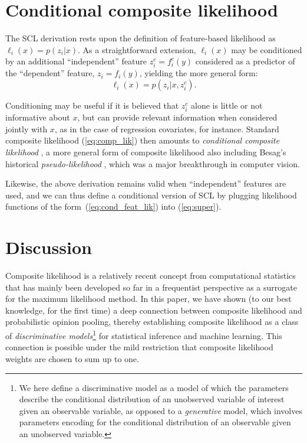 \documentclass[english]{scrartcl}
\begin{document}
\section{Conditional composite likelihood}
\label{sec:conditional}

The SCL derivation rests upon the definition of feature-based likelihood as $\ell_i(x)=p(z_i|x)$. As a straightforward  extension, $\ell_i(x)$ may be conditioned by an additional ``independent'' feature $z^c_i = f^c_i(y)$ considered as a predictor of the ``dependent'' feature, $z_i=f_i(y)$, yielding the more general form:
\begin{equation}
\label{eq:cond_feat_lik}
\ell_i(x) = p(z_i|x,z^c_i).
\end{equation}

Conditioning may be useful if it is believed that $z^c_i$ alone is little or not informative about $x$, but can provide relevant information when considered jointly with $x$, as in the case of regression covariates, for instance. Standard composite likelihood (\ref{eq:comp_lik}) then amounts to {\em conditional composite likelihood} \cite{Varin-11}, a more general form of composite likelihood also including Besag's historical {\em pseudo-likelihood} \cite{Besag-74}, which was a major breakthrough in computer vision. 

Likewise, the above derivation remains valid when ``independent'' features are used, and we can thus define a conditional version of SCL by plugging likelihood functions of the form~(\ref{eq:cond_feat_lik}) into (\ref{eq:super}).




\section{Discussion}
\label{sec:discussion}

Composite likelihood is a relatively recent concept from computational statistics that has mainly been developed so far in a frequentist perspective as a surrogate for the maximum likelihood method. In this paper, we have shown (to our best knowledge, for the first time) a deep connection between composite likelihood and  probabilistic opinion pooling, thereby establishing composite likelihood as a class of {\em discriminative models}\footnote{We here define a discriminative model as a model of which the parameters describe the conditional distribution of an unobserved variable of interest given an observable variable, as opposed to a {\em generative} model, which involves parameters encoding for the conditional distribution of an observable given an unobserved variable.} for statistical inference and machine learning. This connection is possible under the mild restriction that composite likelihood weights are chosen to sum up to one.
\end{document}
